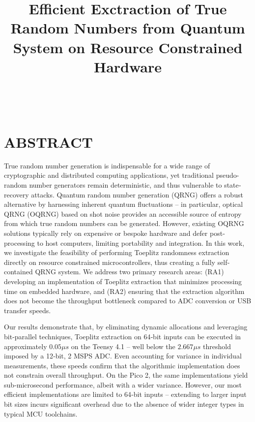 \documentclass{sigchi}
\def\plaintitle{Efficient Exctraction of True Random Numbers from Quantum System on Resource Constrained Hardware}
\begin{document}
\title{\plaintitle}

\author{%
	\\
	\\
}

\maketitle


\section{ABSTRACT}\label{abstract}

True random number generation is indispensable for a wide range of cryptographic and distributed computing applications, yet traditional pseudo-random number generators remain deterministic, and thus vulnerable to state‐recovery attacks. Quantum random number generation (QRNG) offers a robust alternative by harnessing inherent quantum fluctuations -- in particular, optical QRNG (OQRNG) based on shot noise provides an accessible source of entropy from which true random numbers can be generated. However, existing OQRNG solutions typically rely on expensive or bespoke hardware and defer post‐processing to host computers, limiting portability and integration. In this work, we investigate the feasibility of performing Toeplitz randomness extraction directly on resource constrained microcontrollers, thus creating a fully self‐contained QRNG system. We address two primary research areas: (RA1) developing an implementation of Toeplitz extraction that minimizes processing time on embedded hardware, and (RA2) ensuring that the extraction algorithm does not become the throughput bottleneck compared to ADC conversion or USB transfer speeds.

Our results demonstrate that, by eliminating dynamic allocations and leveraging bit‐parallel techniques, Toeplitz extraction on 64‐bit inputs can be executed in approximately \(0.05 \mu s\) on the Teensy 4.1 -- well below the \(2.667 \mu s\) threshold imposed by a 12‐bit, 2 MSPS ADC. Even accounting for variance in individual measurements, these speeds confirm that the algorithmic implementation does not constrain overall throughput. On the Pico 2, the same implementations yield sub‐microsecond performance, albeit with a wider variance. However, our most efficient implementations are limited to 64‐bit inputs -- extending to larger input bit sizes incurs significant overhead due to the absence of wider integer types in typical MCU toolchains.
\end{document}
